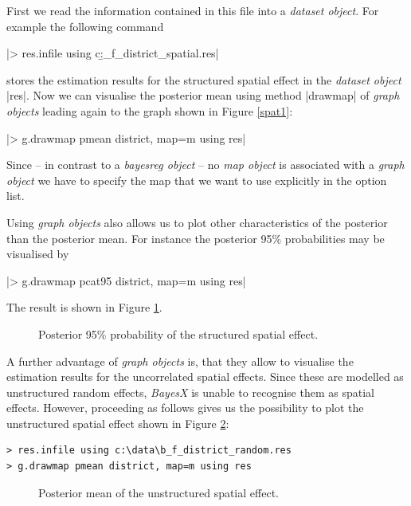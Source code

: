 \documentclass[a4paper]{article}
\begin{document}
First we read the information contained in this file into a {\it
dataset object}. For example the following command

|> res.infile using c:\data\b_f_district_spatial.res|

stores the estimation results for the structured spatial effect in the {\em dataset object} |res|. Now we can visualise the
posterior mean using method |drawmap| of {\it graph objects} leading again to the graph shown in Figure \ref{spat1}:

|> g.drawmap pmean district, map=m using res|

Since -- in contrast to a {\it bayesreg object} -- no {\it map
object} is associated with a {\it graph object} we have to specify
the map that we want to use explicitly in the option list.

Using {\it graph objects} also allows us to plot other
characteristics of the posterior than the posterior mean. For
instance the posterior 95\% probabilities may be visualised by

|> g.drawmap pcat95 district, map=m using res|

The result is shown in Figure \ref{spat2}.

\begin{figure}[ht]
\begin{center}
{\it\caption{Posterior 95\% probability of the structured spatial
effect.\label{spat2}}}
\end{center}
\end{figure}

A further advantage of {\it graph objects} is, that they allow to
visualise the estimation results for the uncorrelated spatial
effects. Since these are modelled as unstructured random effects,
{\it BayesX} is unable to recognise them as spatial effects.
However, proceeding as follows gives us the possibility to plot
the unstructured spatial effect shown in Figure \ref{random1}:

\begin{verbatim}
> res.infile using c:\data\b_f_district_random.res
> g.drawmap pmean district, map=m using res
\end{verbatim}

\begin{figure}[ht]
\begin{center}
{\it\caption{Posterior mean of the unstructured spatial
effect.\label{random1}}}
\end{center}
\end{figure}
\end{document}
